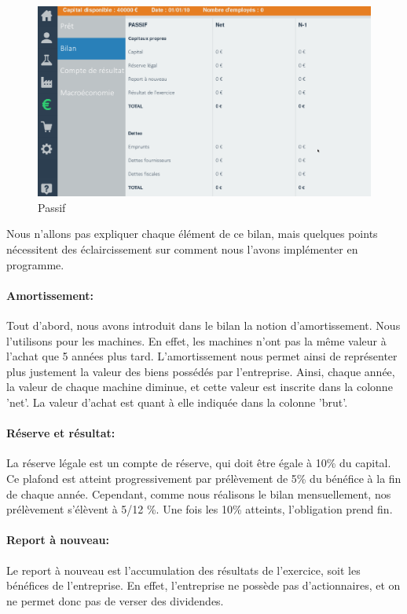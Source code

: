 \begin{figure}[!htb]
\centering
\includegraphics[scale=0.5]{img/passif.png}
\caption{Passif}
\end{figure}

Nous n’allons pas expliquer chaque élément de ce bilan, mais quelques points nécessitent des éclaircissement sur comment nous l’avons implémenter en programme.



\paragraph{Amortissement:} Tout d’abord, nous avons introduit dans le bilan la notion d’amortissement. Nous l’utilisons pour les machines. En effet, les machines n’ont pas la même valeur à l’achat que 5 années plus tard. L’amortissement nous permet ainsi de représenter plus justement la valeur des biens possédés par l'entreprise. Ainsi, chaque année, la valeur de chaque machine diminue, et cette valeur est inscrite dans la colonne 'net'. La valeur d’achat est quant à elle indiquée dans la colonne 'brut'.



\paragraph{Réserve et résultat:}La réserve légale est un compte de réserve, qui doit être égale à 10\% du capital. Ce plafond est atteint progressivement par prélèvement de 5\% du bénéfice à la fin de chaque année. Cependant, comme nous réalisons le bilan mensuellement, nos prélèvement s’élèvent à 5/12 \%. Une fois les 10\% atteints, l'obligation prend fin.



\paragraph{Report à nouveau:}Le report à nouveau est l’accumulation des résultats de l’exercice, soit les bénéfices de l’entreprise. En effet, l’entreprise ne possède pas d’actionnaires, et on ne permet donc pas de verser des dividendes.



